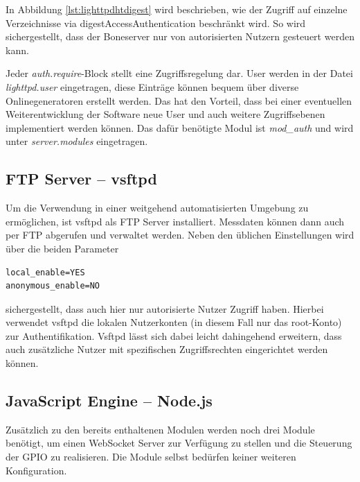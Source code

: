 In Abbildung \ref{lst:lighttpdhtdigest} wird beschrieben, wie der Zugriff auf einzelne Verzeichnisse via \gls{digestAccessAuthentication} beschränkt wird. So wird sichergestellt, dass der Boneserver nur von autorisierten Nutzern gesteuert werden kann.

Jeder \textit{auth.require}-Block stellt eine Zugriffsregelung dar. User werden in der Datei \textit{lighttpd.user} eingetragen, diese Einträge können bequem über diverse Onlinegeneratoren erstellt werden. Das hat den Vorteil, dass bei einer eventuellen Weiterentwicklung der Software neue User und auch weitere Zugriffsebenen implementiert werden können. Das dafür benötigte Modul ist \textit{mod\_auth} und wird unter \textit{server.modules} eingetragen.


\subsection{FTP Server -- vsftpd}
\label{subsec:vsftpd}
Um die Verwendung in einer weitgehend automatisierten Umgebung zu ermöglichen, ist vsftpd als FTP Server installiert. Messdaten können dann auch per FTP abgerufen und verwaltet werden. Neben den üblichen Einstellungen wird über die beiden Parameter

\begin{lstlisting}
local_enable=YES
anonymous_enable=NO
\end{lstlisting}
sichergestellt, dass auch hier nur autorisierte Nutzer Zugriff haben. Hierbei verwendet vsftpd die lokalen Nutzerkonten (in diesem Fall nur das root-Konto) zur Authentifikation. Vsftpd lässt sich dabei leicht dahingehend erweitern, dass auch zusätzliche Nutzer mit spezifischen Zugriffsrechten eingerichtet werden können.


\subsection{JavaScript Engine -- Node.js}

Zusätzlich zu den bereits enthaltenen Modulen werden noch drei Module benötigt, um einen WebSocket Server zur Verfügung zu stellen und die Steuerung der GPIO zu realisieren. Die Module selbst bedürfen keiner weiteren Konfiguration.

